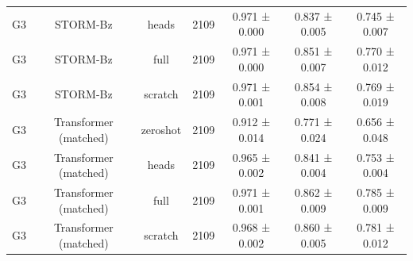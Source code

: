 \begin{tabular}{lcccccc}
G3 & STORM-Bz & heads & 2109 & 0.971 ± 0.000 & 0.837 ± 0.005 & 0.745 ± 0.007 \\
G3 & STORM-Bz & full & 2109 & 0.971 ± 0.000 & 0.851 ± 0.007 & 0.770 ± 0.012 \\
G3 & STORM-Bz & scratch & 2109 & 0.971 ± 0.001 & 0.854 ± 0.008 & 0.769 ± 0.019 \\
G3 & Transformer (matched) & zeroshot & 2109 & 0.912 ± 0.014 & 0.771 ± 0.024 & 0.656 ± 0.048 \\
G3 & Transformer (matched) & heads & 2109 & 0.965 ± 0.002 & 0.841 ± 0.004 & 0.753 ± 0.004 \\
G3 & Transformer (matched) & full & 2109 & 0.971 ± 0.001 & 0.862 ± 0.009 & 0.785 ± 0.009 \\
G3 & Transformer (matched) & scratch & 2109 & 0.968 ± 0.002 & 0.860 ± 0.005 & 0.781 ± 0.012 \\
\bottomrule
\end{tabular}
